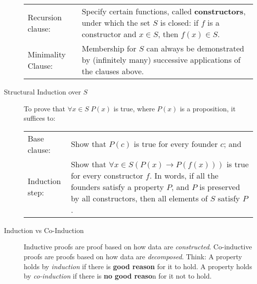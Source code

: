 \documentclass{article}
\begin{document}
\begin{description}
\begin{table}[h]
\begin{tabular}{lp{6in}}
			Recursion clause: & Specify certain functions, called \textbf{constructors}, under which the set $S$ is closed: if $f$ is a constructor and $x\in S$, then $f(x)\in S$. \\
			Minimality Clause: & Membership for $S$ can always be demonstrated by (infinitely many) successive applications of the clauses above. \\
		\end{tabular}
	\end{table}	     
	\endgroup
	\item[Structural Induction over $S$] To prove that $\forall x\in S\; P(x)$ is true, where $P(x)$ is a proposition, it suffices to:
	\begingroup
	\setlength{\tabcolsep}{6pt} %
	\renewcommand{\arraystretch}{1.5} %
	\begin{table}[h]
		\centering
		\begin{tabular}{lp{6in}}
			Base clause: & Show that $P(c)$ is true for every founder $c$; and \\
			Induction step: & Show that $\forall x\in S(P(x)\to P(f(x)))$ is true for every constructor $f$. In words, if all the founders satisfy a property $P$, and $P$ is preserved by all constructors, then all elements of $S$ satisfy $P$. \\
		\end{tabular}
	\end{table}	     
	\endgroup
	\item[Induction vs Co-Induction] Inductive proofs are proof based on how data are \emph{constructed}. Co-inductive proofs are proofs based on how data are \emph{decomposed}. Think: A property holds by \emph{induction} if there is \textbf{good reason} for it to hold. A property holds by \emph{co-induction} if there is \textbf{no good reaso}n for it not to hold.
	

\end{description}
\end{document}
